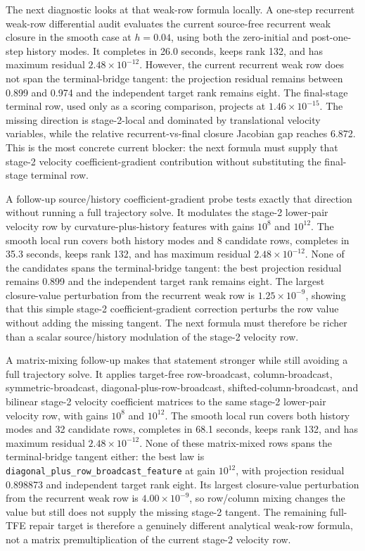 \documentclass[11pt]{article}
\newcommand{\tfe}{TFE}
\begin{document}
The next diagnostic looks at that weak-row formula locally.  A one-step
recurrent weak-row differential audit evaluates the current source-free
recurrent weak closure in the smooth case at $h=0.04$, using both the
zero-initial and post-one-step history modes.  It completes in 26.0 seconds,
keeps rank 132, and has maximum residual $2.48\times10^{-12}$.  However, the
current recurrent weak row does not span the terminal-bridge tangent: the
projection residual remains between 0.899 and 0.974 and the independent target
rank remains eight.  The final-stage terminal row, used only as a scoring
comparison, projects at $1.46\times10^{-15}$.  The missing direction is
stage-2-local and dominated by translational velocity variables, while the
relative recurrent-vs-final closure Jacobian gap reaches 6.872.  This is the
most concrete current blocker: the next formula must supply that stage-2
velocity coefficient-gradient contribution without substituting the
final-stage terminal row.

A follow-up source/history coefficient-gradient probe tests exactly that
direction without running a full trajectory solve.  It modulates the stage-2
lower-pair velocity row by curvature-plus-history features with gains
$10^8$ and $10^{12}$.  The smooth local run covers both history modes and 8
candidate rows, completes in 35.3 seconds, keeps rank 132, and has maximum
residual $2.48\times10^{-12}$.  None of the candidates spans the
terminal-bridge tangent: the best projection residual remains 0.899 and the
independent target rank remains eight.  The largest closure-value perturbation
from the recurrent weak row is $1.25\times10^{-9}$, showing that this simple
stage-2 coefficient-gradient correction perturbs the row value without adding
the missing tangent.  The next formula must therefore be richer than a scalar
source/history modulation of the stage-2 velocity row.

A matrix-mixing follow-up makes that statement stronger while still avoiding a
full trajectory solve.  It applies target-free row-broadcast, column-broadcast,
symmetric-broadcast, diagonal-plus-row-broadcast, shifted-column-broadcast, and
bilinear stage-2 velocity coefficient matrices to the same stage-2 lower-pair
velocity row, with gains $10^8$ and $10^{12}$.  The smooth local run covers
both history modes and 32 candidate rows, completes in 68.1 seconds, keeps rank
132, and has maximum residual
$2.48\times10^{-12}$.  None of these matrix-mixed rows spans the
terminal-bridge tangent either: the best law is
\texttt{diagonal\_plus\_row\_broadcast\_feature} at gain $10^{12}$, with
projection residual 0.898873 and independent target rank eight.  Its largest
closure-value perturbation from the recurrent weak row is
$4.00\times10^{-9}$, so row/column mixing changes the value but still does not
supply the missing stage-2 tangent.  The remaining full-\tfe{} repair target is
therefore a genuinely different analytical weak-row formula, not a matrix
premultiplication of the current stage-2 velocity row.
\end{document}
